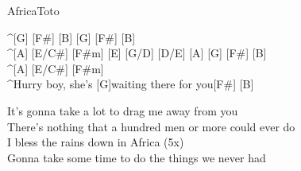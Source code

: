 \begin{song}{Africa}{Toto}

\begin{guitar}
^[G]  [F#]  [B]  [G] [F#] [B] \\
^[A]  [E/C#]  [F#m]  [E]  [G/D]  [D/E]  [A] [G]  [F#]  [B] \\
^[A]  [E/C#]  [F#m] \\
^Hurry boy, she's [G]waiting there for you[F#] [B]\\
\end{guitar}

\begin{guitar}
It's gonna take a lot to drag me away from you\\
There's nothing that a hundred men or more could ever do\\
I bless the rains down in Africa (5x)\\
Gonna take some time to do the things we never had\\
\end{guitar}

\end{song}
